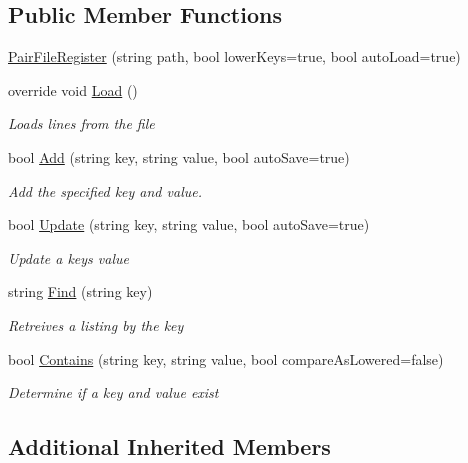 \subsection*{Public Member Functions}
\begin{DoxyCompactItemize}
\item 
\hyperlink{class_o_t_a_1_1_misc_1_1_pair_file_register_af76a03c418e80ba7f737465bb4c23954}{Pair\+File\+Register} (string path, bool lower\+Keys=true, bool auto\+Load=true)
\item 
override void \hyperlink{class_o_t_a_1_1_misc_1_1_pair_file_register_add3bcbb3452b1a803e32169fa82a3ccf}{Load} ()
\begin{DoxyCompactList}\small\item\em Loads lines from the file \end{DoxyCompactList}\item 
bool \hyperlink{class_o_t_a_1_1_misc_1_1_pair_file_register_ab5fa823b5556eba432ea58557b33e64a}{Add} (string key, string value, bool auto\+Save=true)
\begin{DoxyCompactList}\small\item\em Add the specified key and value. \end{DoxyCompactList}\item 
bool \hyperlink{class_o_t_a_1_1_misc_1_1_pair_file_register_a3bc224aa33de00d534625c1618983bad}{Update} (string key, string value, bool auto\+Save=true)
\begin{DoxyCompactList}\small\item\em Update a keys value \end{DoxyCompactList}\item 
string \hyperlink{class_o_t_a_1_1_misc_1_1_pair_file_register_ac52adeb08cf8f98d6aa57c21f36e9984}{Find} (string key)
\begin{DoxyCompactList}\small\item\em Retreives a listing by the key \end{DoxyCompactList}\item 
bool \hyperlink{class_o_t_a_1_1_misc_1_1_pair_file_register_aba3c97d01de0bcf7cd62247f3789bddc}{Contains} (string key, string value, bool compare\+As\+Lowered=false)
\begin{DoxyCompactList}\small\item\em Determine if a key and value exist \end{DoxyCompactList}\end{DoxyCompactItemize}
\subsection*{Additional Inherited Members}


